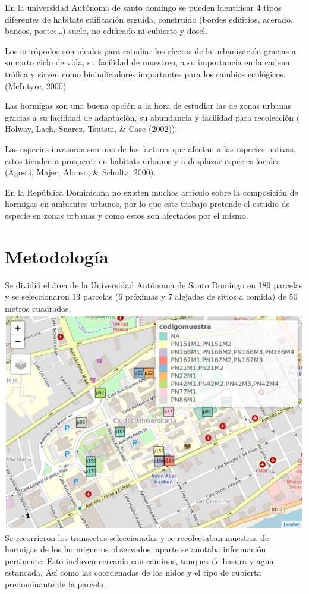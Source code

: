 \documentclass[11pt,]{article}
\begin{document}
En la universidad Autónoma de santo domingo se pueden identificar 4
tipos diferentes de habitats edificación erguida, construido (bordes
edificios, acerado, bancos, postes\ldots{}) suelo, no edificado ni
cubierto y dosel.

Los artrópodos son ideales para estudiar los efectos de la urbanización
gracias a su corto ciclo de vida, su facilidad de muestreo, a su
importancia en la cadena trófica y sirven como bioindicadores
importantes para los cambios ecológicos. (McIntyre, 2000)

Las hormigas son una buena opción a la hora de estudiar las de zonas
urbanas gracias a su facilidad de adaptación, su abundancia y facilidad
para recolección ( Holway, Lach, Suarez, Tsutsui, \& Case (2002)).

Las especies invasoras son uno de los factores que afectan a las
especies nativas, estos tienden a prosperar en habitats urbanos y a
desplazar especies locales (Agosti, Majer, Alonso, \& Schultz, 2000).

En la República Dominicana no existen muchos articulo sobre la
composición de hormigas en ambientes urbanos, por lo que este trabajo
pretende el estudio de especie en zonas urbanas y como estos son
afectados por el mismo.

\section{Metodología}\label{metodologuxeda}

Se dividió el área de la Universidad Autónoma de Santo Domingo en 189
parcelas y se seleccionaron 13 parcelas (6 próximas y 7 alejadas de
sitios a comida) de 50 metros cuadrados.
\includegraphics{img/area de estudio y parcelas.png} Se recorrieron los
transectos seleccionadas y se recolectaban muestras de hormigas de los
hormigueros observados, aparte se anotaba información pertinente. Esto
incluyen cercanía con caminos, tanques de basura y agua estancada, Así
como las coordenadas de los nidos y el tipo de cubierta predominante de
la parcela.
\end{document}
